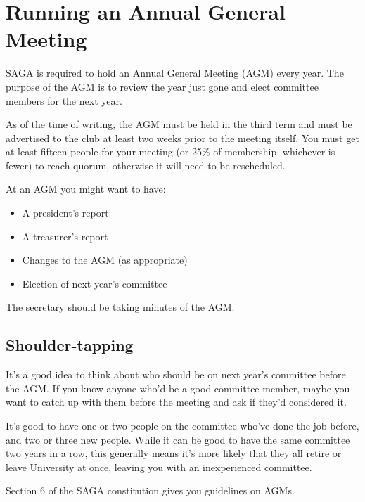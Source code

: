 \section{Running an Annual General Meeting}
\label{sec:agm}

SAGA is required to hold an Annual General Meeting (AGM) every year. The purpose of the AGM is to review the year just gone and elect committee members for the next year.

As of the time of writing, the AGM must be held in the third term and must be advertised to the club at least two weeks prior to the meeting itself. You must get at least fifteen people for your meeting (or 25\% of membership, whichever is fewer) to reach quorum, otherwise it will need to be rescheduled.

At an AGM you might want to have:

\begin{itemize}
  \item A president's report
  \item A treasurer's report
  \item Changes to the AGM (as appropriate)
  \item Election of next year's committee
\end{itemize}

The secretary should be taking minutes of the AGM.

\subsection{Shoulder-tapping}

It's a good idea to think about who should be on next year's committee before the AGM. If you know anyone who'd be a good committee member, maybe you want to catch up with them before the meeting and ask if they'd considered it.

It's good to have one or two people on the committee who've done the job before, and two or three new people. While it can be good to have the same committee two years in a row, this generally means it's more likely that they all retire or leave University at once, leaving you with an inexperienced committee.

Section 6 of the SAGA constitution gives you guidelines on AGMs.
